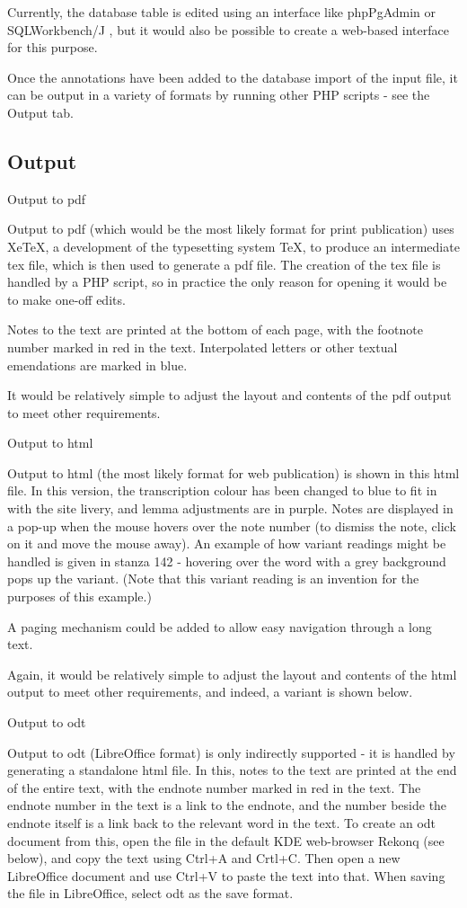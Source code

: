 \documentclass[a4paper,10pt]{article}
\begin{document}
Currently, the database table is edited using an interface like phpPgAdmin or SQLWorkbench/J , but it would also be possible to create a web-based interface for this purpose.

Once the annotations have been added to the database import of the input file, it can be output in a variety of formats by running other PHP scripts - see the Output tab.

\subsection{Output}

Output to pdf

Output to pdf (which would be the most likely format for print publication) uses XeTeX, a development of the typesetting system TeX, to produce an intermediate tex file, which is then used to generate a pdf file. The creation of the tex file is handled by a PHP script, so in practice the only reason for opening it would be to make one-off edits.

Notes to the text are printed at the bottom of each page, with the footnote number marked in red in the text. Interpolated letters or other textual emendations are marked in blue.

It would be relatively simple to adjust the layout and contents of the pdf output to meet other requirements.

Output to html

Output to html (the most likely format for web publication) is shown in this html file. In this version, the transcription colour has been changed to blue to fit in with the site livery, and lemma adjustments are in purple. Notes are displayed in a pop-up when the mouse hovers over the note number (to dismiss the note, click on it and move the mouse away). An example of how variant readings might be handled is given in stanza 142 - hovering over the word with a grey background pops up the variant. (Note that this variant reading is an invention for the purposes of this example.)

A paging mechanism could be added to allow easy navigation through a long text.

Again, it would be relatively simple to adjust the layout and contents of the html output to meet other requirements, and indeed, a variant is shown below.

Output to odt

Output to odt (LibreOffice format) is only indirectly supported - it is handled by generating a standalone html file. In this, notes to the text are printed at the end of the entire text, with the endnote number marked in red in the text. The endnote number in the text is a link to the endnote, and the number beside the endnote itself is a link back to the relevant word in the text. To create an odt document from this, open the file in the default KDE web-browser Rekonq (see below), and copy the text using Ctrl+A and Crtl+C. Then open a new LibreOffice document and use Ctrl+V to paste the text into that. When saving the file in LibreOffice, select odt as the save format.
\end{document}
